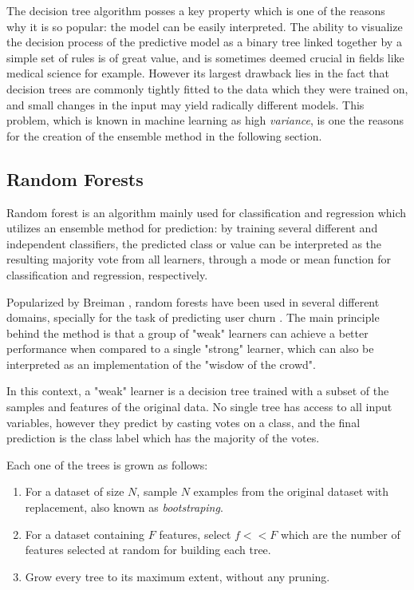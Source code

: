 \documentclass{kththesis}
\begin{document}
The decision tree algorithm posses a key property which is one of the reasons why it is so popular: the model can be easily interpreted. The ability to visualize the decision process of the predictive model as a binary tree linked together by a simple set of rules is of great value, and is sometimes deemed crucial in fields like medical science for example. However its largest drawback lies in the fact that decision trees are commonly tightly fitted to the data which they were trained on, and small changes in the input may yield radically different models. This problem, which is known in machine learning as high \emph{variance}, is one the reasons for the creation of the ensemble method in the following section.
 
\subsection{Random Forests}

Random forest is an algorithm mainly used for classification and regression which utilizes an ensemble method for prediction: by training several different and independent classifiers, the predicted class or value can be interpreted as the resulting majority vote from all learners, through a mode or mean function for classification and regression, respectively.

Popularized by Breiman \citep{breiman2001random}, random forests have been used in several different domains, specially for the task of predicting user churn \citep{coussement2013customer} \citep{burez2008separating}. The main principle behind the method is that a group of "weak" learners can achieve a better performance when compared to a single "strong" learner, which can also be interpreted as an implementation of the "wisdow of the crowd". 

In this context, a "weak" learner is a decision tree trained with a subset of the samples and features of the original data. No single tree has access to all input variables, however they predict by casting votes on a class, and the final prediction is the class label which has the majority of the votes.

Each one of the trees is grown as follows:

\begin{enumerate}
\item For a dataset of size $N$, sample $N$ examples from the original dataset with replacement, also known as \emph{bootstraping}.
\item For a dataset containing $F$ features, select $f<<F$ which are the number of features selected at random for building each tree.
\item Grow every tree to its maximum extent, without any pruning.
\end{enumerate}
\end{document}
